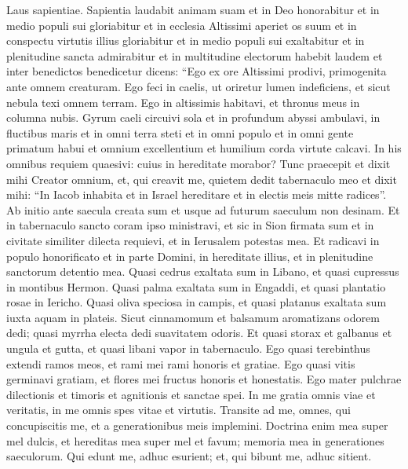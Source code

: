 \begin{biblechapter}  
\verse Laus sapientiae. Sapientia laudabit animam suam et in Deo honorabitur et in medio populi sui gloriabitur 
\verse et in ecclesia Altissimi aperiet os suum et in conspectu virtutis illius gloriabitur 
\verse et in medio populi sui exaltabitur et in plenitudine sancta admirabitur 
\verse et in multitudine electorum habebit laudem et inter benedictos benedicetur dicens: 
\verse “Ego ex ore Altissimi prodivi, primogenita ante omnem creaturam. 
\verse Ego feci in caelis, ut oriretur lumen indeficiens, et sicut nebula texi omnem terram. 
\verse Ego in altissimis habitavi, et thronus meus in columna nubis. 
\verse Gyrum caeli circuivi sola et in profundum abyssi ambulavi, 
\verse in fluctibus maris et in omni terra steti 
\verse et in omni populo et in omni gente primatum habui 
\verse et omnium excellentium et humilium corda virtute calcavi. In his omnibus requiem quaesivi: cuius in hereditate morabor? 
\verse Tunc praecepit et dixit mihi Creator omnium, et, qui creavit me, quietem dedit tabernaculo meo 
\verse et dixit mihi: “In Iacob inhabita et in Israel hereditare et in electis meis mitte radices”. 
\verse Ab initio ante saecula creata sum et usque ad futurum saeculum non desinam. 
\verse Et in tabernaculo sancto coram ipso ministravi, et sic in Sion firmata sum et in civitate similiter dilecta requievi, et in Ierusalem potestas mea. 
\verse Et radicavi in populo honorificato et in parte Domini, in hereditate illius, et in plenitudine sanctorum detentio mea. 
\verse Quasi cedrus exaltata sum in Libano, et quasi cupressus in montibus Hermon. 
\verse Quasi palma exaltata sum in Engaddi, et quasi plantatio rosae in Iericho. 
\verse Quasi oliva speciosa in campis, et quasi platanus exaltata sum iuxta aquam in plateis. 
\verse Sicut cinnamomum et balsamum aromatizans odorem dedi; quasi myrrha electa dedi suavitatem odoris. 
\verse Et quasi storax et galbanus et ungula et gutta, et quasi libani vapor in tabernaculo. 
\verse Ego quasi terebinthus extendi ramos meos, et rami mei rami honoris et gratiae. 
\verse Ego quasi vitis germinavi gratiam, et flores mei fructus honoris et honestatis. 
\verse Ego mater pulchrae dilectionis et timoris et agnitionis et sanctae spei. 
\verse In me gratia omnis viae et veritatis, in me omnis spes vitae et virtutis. 
\verse Transite ad me, omnes, qui concupiscitis me, et a generationibus meis implemini. 
\verse Doctrina enim mea super mel dulcis, et hereditas mea super mel et favum; 
\verse memoria mea in generationes saeculorum. 
\verse Qui edunt me, adhuc esurient; et, qui bibunt me, adhuc sitient. 

\end{biblechapter}
